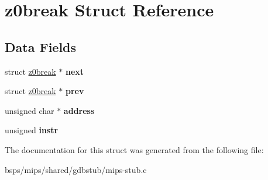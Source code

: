 \hypertarget{structz0break}{}\section{z0break Struct Reference}
\label{structz0break}
\subsection*{Data Fields}
\begin{DoxyCompactItemize}
\item 
\mbox{\label{structz0break_a016e5f02971bf1009e1dc623bf151247}} 
struct \mbox{\hyperlink{structz0break}{z0break}} $\ast$ {\bfseries next}
\item 
\mbox{\label{structz0break_a1431ea2b7f76f4bcafafbdd96314d1ca}} 
struct \mbox{\hyperlink{structz0break}{z0break}} $\ast$ {\bfseries prev}
\item 
\mbox{\label{structz0break_a67d8f1dc89923a3f7d3a04cf84cc5331}} 
unsigned char $\ast$ {\bfseries address}
\item 
\mbox{\label{structz0break_a222670f2e0675391f4a89909f8fc6258}} 
unsigned {\bfseries instr}
\end{DoxyCompactItemize}


The documentation for this struct was generated from the following file\+:\begin{DoxyCompactItemize}
\item 
bsps/mips/shared/gdbstub/mips-\/stub.\+c\end{DoxyCompactItemize}
